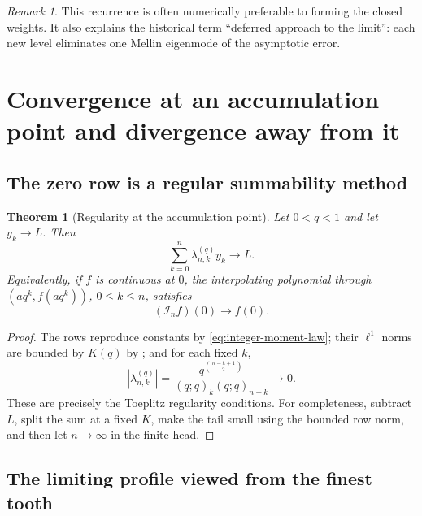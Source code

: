 \documentclass[11pt,a4paper,oneside]{article}
\newtheorem{theorem}{Theorem}[section]
\theoremstyle{definition}
\theoremstyle{remark}
\newtheorem{remark}[remark]{Remark}
\newcommand{\Iop}{\mathcal I}
\begin{document}
\begin{remark}
This recurrence is often numerically preferable to forming the closed weights.
It also explains the historical term ``deferred approach to the limit'': each
new level eliminates one Mellin eigenmode of the asymptotic error.
\end{remark}

\section{Convergence at an accumulation point and divergence away from it}
\label{sec:superflat}

\subsection{The zero row is a regular summability method}

\begin{theorem}[Regularity at the accumulation point]
\label{thm:regular-summability}
Let $0<q<1$ and let $y_k\to L$.  Then
\begin{equation}
 \sum_{k=0}^n\lambda_{n,k}^{(q)}y_k\longrightarrow L.
 \label{eq:regular-summability}
\end{equation}
Equivalently, if $f$ is continuous at $0$, the interpolating polynomial through
$(aq^k,f(aq^k))$, $0\le k\le n$, satisfies
\begin{equation}
 (\Iop_nf)(0)\longrightarrow f(0).
 \label{eq:continuous-zero-convergence}
\end{equation}
\end{theorem}

\begin{proof}
The rows reproduce constants by \eqref{eq:integer-moment-law}; their
$\ell^1$ norms are bounded by $K(q)$ by ; and for each fixed
$k$,
\[
 |\lambda_{n,k}^{(q)}|
 =\frac{q^{\binom{n-k+1}{2}}}
 {(q;q)_k(q;q)_{n-k}}\longrightarrow0.
\]
These are precisely the Toeplitz regularity conditions.  For completeness,
subtract $L$, split the sum at a fixed $K$, make the tail small using the
bounded row norm, and then let $n\to\infty$ in the finite head.
\end{proof}

\subsection{The limiting profile viewed from the finest tooth}
\end{document}
